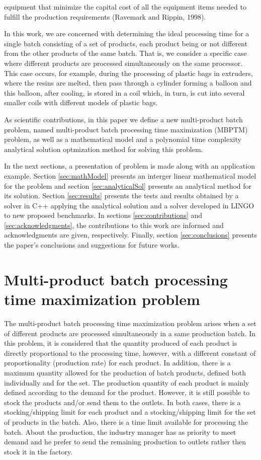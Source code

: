 \documentclass[authoryear,manuscript,12pt]{elsarticle}
\begin{document}
equipment that minimize the capital cost of all the equipment items needed to fulfill the production requirements (Ravemark and Rippin, 1998).

In this work, we are concerned with determining the ideal processing time for a single batch consisting of a set of products, each product being or not different from the other products of the same batch. That is, we consider a specific case where different products are processed simultaneously on the same processor. This case occurs, for example, during the processing of plastic bags in extruders, where the resins are melted, then pass through a cylinder forming a balloon and this balloon, after cooling, is stored in a coil which, in turn, is cut into several smaller coils with different models of plastic bags.

As scientific contributions, in this paper we define a new multi-product batch problem, named multi-product batch processing time maximization (MBPTM) problem, as well as a mathematical model and a polynomial time complexity analytical solution optmization method for solving this problem.

In the next sections, a presentation of problem is made along with an application example. Section \ref{sec:mathModel} presents an interger linear mathematical model for the problem and section \ref{sec:analyticalSol} presents an analytical method for its solution. Section \ref{sec:results} presents the tests and results obtained by a solver in C++ applying the analytical solution and a solver developed in LINGO to new proposed benchmarks. In sections \ref{sec:contributions} and \ref{sec:acknowledgments}, the contributions to this work are informed and acknowledgments are given, respectively. Finally, section \ref{sec:conclusions} presents the paper's conclusions and suggestions for future works.

\section{Multi-product batch processing time maximization problem}
\label{sec:MBPTMP}

The multi-product batch processing time maximization problem arises when a set of different products are processed simultaneously in a same production batch. In this problem, it is considered that the quantity produced of each product is directly proportional to the processing time, however, with a different constant of proportionality (production rate) for each product. In addition, there is a maximum quantity allowed for the production of batch products, defined both individually and for the set. The production quantity of each product is mainly defined according to the demand for the product. However, it is still possible to stock the products and/or send them to the outlets. In both cases, there is a stocking/shipping limit for each product and a stocking/shipping limit for the set of products in the batch. Also, there is a time limit available for processing the batch. About the production, the industry manager has as priority to meet demand and he prefer to send the remaining production to outlets rather then stock it in the factory. 
\end{document}
